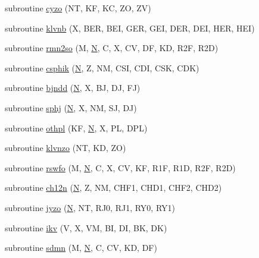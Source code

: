 \begin{DoxyCompactItemize}
subroutine \hyperlink{specfun_8f_a503e67f4d9386860000fed4a948aa77e}{cyzo} (N\+T, K\+F, K\+C, Z\+O, Z\+V)
\item 
subroutine \hyperlink{specfun_8f_ae82093512494b6a4b1d0cc38637f3cf0}{klvnb} (X, B\+E\+R, B\+E\+I, G\+E\+R, G\+E\+I, D\+E\+R, D\+E\+I, H\+E\+R, H\+E\+I)
\item 
subroutine \hyperlink{specfun_8f_a0168eccc27d220513ed43e85396f2dbe}{rmn2so} (M, \hyperlink{polmisc_8c_a0240ac851181b84ac374872dc5434ee4}{N}, C, X, C\+V, D\+F, K\+D, R2\+F, R2\+D)
\item 
subroutine \hyperlink{specfun_8f_a2af61f9f80efce37bda80b705797d653}{csphik} (\hyperlink{polmisc_8c_a0240ac851181b84ac374872dc5434ee4}{N}, Z, N\+M, C\+S\+I, C\+D\+I, C\+S\+K, C\+D\+K)
\item 
subroutine \hyperlink{specfun_8f_af6d6d2aed8c208c4d692605298f88e3c}{bjndd} (\hyperlink{polmisc_8c_a0240ac851181b84ac374872dc5434ee4}{N}, X, B\+J, D\+J, F\+J)
\item 
subroutine \hyperlink{specfun_8f_af6ce667d8bb7e569fc4cf5814b4676af}{sphj} (\hyperlink{polmisc_8c_a0240ac851181b84ac374872dc5434ee4}{N}, X, N\+M, S\+J, D\+J)
\item 
subroutine \hyperlink{specfun_8f_a39295033aa3f3b845d31e2a3746feaf9}{othpl} (K\+F, \hyperlink{polmisc_8c_a0240ac851181b84ac374872dc5434ee4}{N}, X, P\+L, D\+P\+L)
\item 
subroutine \hyperlink{specfun_8f_acf1b6b1a81366d6f38914cee3d82822d}{klvnzo} (N\+T, K\+D, Z\+O)
\item 
subroutine \hyperlink{specfun_8f_aaf4c1a963ef9bf03434741007a137df5}{rswfo} (M, \hyperlink{polmisc_8c_a0240ac851181b84ac374872dc5434ee4}{N}, C, X, C\+V, K\+F, R1\+F, R1\+D, R2\+F, R2\+D)
\item 
subroutine \hyperlink{specfun_8f_ac8ef4eeb3c032f067340a344e892919e}{ch12n} (\hyperlink{polmisc_8c_a0240ac851181b84ac374872dc5434ee4}{N}, Z, N\+M, C\+H\+F1, C\+H\+D1, C\+H\+F2, C\+H\+D2)
\item 
subroutine \hyperlink{specfun_8f_a8c3a9fa58d62f9c50fc1da5aa9578d06}{jyzo} (\hyperlink{polmisc_8c_a0240ac851181b84ac374872dc5434ee4}{N}, N\+T, R\+J0, R\+J1, R\+Y0, R\+Y1)
\item 
subroutine \hyperlink{specfun_8f_a20795b704366cd5f854f0d75126b943d}{ikv} (V, X, V\+M, B\+I, D\+I, B\+K, D\+K)
\item 
subroutine \hyperlink{specfun_8f_abe4567009a49b68cd297f480dab3f45c}{sdmn} (M, \hyperlink{polmisc_8c_a0240ac851181b84ac374872dc5434ee4}{N}, C, C\+V, K\+D, D\+F)
\item 

\end{DoxyCompactItemize}
